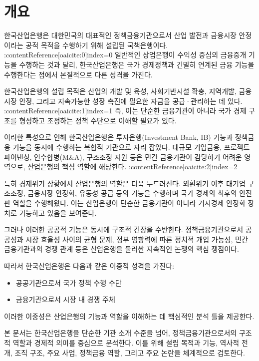 \section{개요}

한국산업은행은 대한민국의 대표적인 정책금융기관으로서 산업 발전과 금융시장 안정이라는 공적 목적을 수행하기 위해 설립된 국책은행이다. :contentReference[oaicite:0]{index=0}  
일반적인 상업은행이 수익성 중심의 금융중개 기능을 수행하는 것과 달리, 한국산업은행은 국가 경제정책과 긴밀히 연계된 금융 기능을 수행한다는 점에서 본질적으로 다른 성격을 가진다.

한국산업은행의 설립 목적은 산업의 개발 및 육성, 사회기반시설 확충, 지역개발, 금융시장 안정, 그리고 지속가능한 성장 촉진에 필요한 자금을 공급·관리하는 데 있다. :contentReference[oaicite:1]{index=1}  
즉, 이는 단순한 금융기관이 아니라 국가 경제 구조를 형성하고 조정하는 정책 수단으로 이해할 필요가 있다.

이러한 특성으로 인해 한국산업은행은 투자은행(Investment Bank, IB) 기능과 정책금융 기능을 동시에 수행하는 복합적 기관으로 자리 잡았다. 대규모 기업금융, 프로젝트 파이낸싱, 인수합병(M\&A), 구조조정 지원 등은 민간 금융기관이 감당하기 어려운 영역으로, 산업은행의 핵심 역할에 해당한다. :contentReference[oaicite:2]{index=2}  

특히 경제위기 상황에서 산업은행의 역할은 더욱 두드러진다. 외환위기 이후 대기업 구조조정, 금융시장 안정화, 유동성 공급 등의 기능을 수행하며 국가 경제의 최후의 안전판 역할을 수행해왔다. 이는 산업은행이 단순한 금융기관이 아니라 거시경제 안정화 장치로 기능하고 있음을 보여준다.

그러나 이러한 공공적 기능은 동시에 구조적 긴장을 수반한다. 정책금융기관으로서 공공성과 시장 효율성 사이의 균형 문제, 정부 영향력에 따른 정치적 개입 가능성, 민간 금융기관과의 경쟁 관계 등은 산업은행을 둘러싼 지속적인 논쟁의 핵심 쟁점이다.

따라서 한국산업은행은 다음과 같은 이중적 성격을 가진다:
\begin{itemize}
    \item 공공기관으로서 국가 정책 수행 수단
    \item 금융기관으로서 시장 내 경쟁 주체
\end{itemize}

이러한 이중성은 산업은행의 기능과 역할을 이해하는 데 핵심적인 분석 틀을 제공한다.

본 문서는 한국산업은행을 단순한 기관 소개 수준을 넘어, 정책금융기관으로서의 구조적 역할과 경제적 의미를 중심으로 분석한다. 이를 위해 설립 목적과 기능, 역사적 전개, 조직 구조, 주요 사업, 정책금융 역할, 그리고 주요 논란을 체계적으로 검토한다.